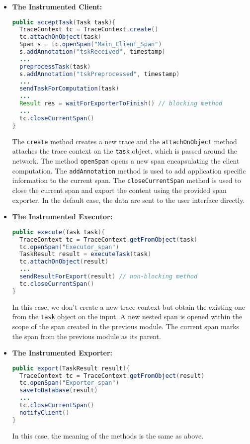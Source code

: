 \begin{itemize}
\item \textbf{The Instrumented Client:}
\begin{lstlisting}[language=Java]
public acceptTask(Task task){
  TraceContext tc = TraceContext.create()
  tc.attachOnObject(task)
  Span s = tc.openSpan("Main_Client_Span")	
  s.addAnnotation("tskReceived", timestamp)
  ...
  preprocessTask(task)
  s.addAnnotation("tskPreprocessed", timestamp)
  ...
  sendTaskForComputation(task)
  ...
  Result res = waitForExporterToFinish() // blocking method
  ...
  tc.closeCurrentSpan()
}
\end{lstlisting}
The \texttt{create} method creates a new trace and the \texttt{attachOnObject} method attaches the trace context on the \texttt{task} object, which is passed around the network. The method \texttt{openSpan} opens a new span encapsulating the client computation. The \texttt{addAnnotation} method is used to add application specific information to the current span. The \texttt{closeCurrentSpan} method is used to close the current span and export the content using the provided span exporter. In the default case, the data are sent to the user interface directly.


\item \textbf{The Instrumented Executor:}
\begin{lstlisting}[language=Java]
public execute(Task task){
  TraceContext tc = TraceContext.getFromObject(task)
  tc.openSpan("Executor_span")
  TaskResult result = executeTask(task)
  tc.attachOnObject(result)
  ...
  sendResultForExport(result) // non-blocking method
  tc.closeCurrentSpan()
}
\end{lstlisting}
In this case, we don't create a new trace context but obtain the existing one from the \texttt{task} object on the input. A new nested span is opened within the scope of the span created in the previous module. The current span marks the span from the previous module as its parent.

\item \textbf{The Instrumented Exporter:}
\begin{lstlisting}[language=Java]
public export(TaskResult result){
  TraceContext tc = TraceContext.getFromObject(result)
  tc.openSpan("Exporter_span")
  saveToDatabase(result)
  ...
  tc.closeCurrentSpan()
  notifyClient()	
}
\end{lstlisting}
In this case, the meaning of the methods is the same as above.

\end{itemize}

